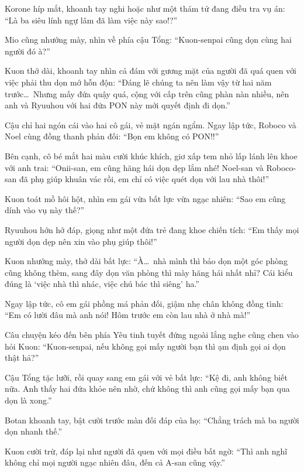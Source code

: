 \documentclass[../main.tex]{subfiles}
\begin{document}
Korone híp mắt, khoanh tay nghi hoặc như một thám tử đang điều tra vụ án: ``Là ba siêu lính ngự lâm đã làm việc này sao!?''


Mio cũng nhướng mày, nhìn về phía cậu Tổng: ``Kuon-senpai cũng dọn cùng hai người đó à?''

Kuon thở dài, khoanh tay nhìn cả đám với gương mặt của người đã quá quen với việc phải thu dọn mớ hỗn độn: ``Đáng lẽ chúng ta nên làm vậy từ hai năm trước\dots\ Nhưng mấy đứa quậy quá, cộng với cấp trên cũng phàn nàn nhiều, nên anh và Ryuuhou với hai đứa PON này mới quyết định đi dọn.''

Cậu chỉ hai ngón cái vào hai cô gái, vẻ mặt ngán ngẩm. Ngay lập tức, Roboco và Noel cùng đồng thanh phản đối: ``Bọn em không có PON!!''

Bên cạnh, cô bé mắt hai màu cười khúc khích, giơ xấp tem nhỏ lấp lánh lên khoe với anh trai: ``Onii-san, em cũng hăng hái dọn dẹp lắm nhé! Noel-san và Roboco-san đã phụ giúp khuân vác rồi, em chỉ có việc quét dọn với lau nhà thôi!''

Kuon toát mồ hôi hột, nhìn em gái vừa bất lực vừa ngạc nhiên: ``Sao em cũng dính vào vụ này thế?''

Ryuuhou hớn hở đáp, giọng như một đứa trẻ đang khoe chiến tích: ``Em thấy mọi người dọn dẹp nên xin vào phụ giúp thôi!''

Kuon nhướng mày, thở dài bất lực: ``À\dots\ nhà mình thì bảo dọn một góc phòng cũng không thèm, sang đây dọn văn phòng thì mày hăng hái nhất nhỉ? Cái kiểu đúng là `việc nhà thì nhác, việc chú bác thì siêng' ha.''

Ngay lập tức, cô em gái phồng má phản đối, giậm nhẹ chân không đồng tình: ``Em có lười đâu mà anh nói! Hôm trước em còn lau nhà ở nhà mà!''

Câu chuyện kéo đến bên phía Yêu tinh tuyết đứng ngoài lắng nghe cũng chen vào hỏi Kuon: ``Kuon-senpai, nếu không gọi mấy người bạn thì ạm định gọi ai dọn thật hả?''

Cậu Tổng tặc lưỡi, rồi quay sang em gái với vẻ bất lực: ``Kệ đi, anh không biết nữa. Anh thấy hai đứa khỏe nên nhờ, chứ không thì anh cũng gọi mấy bạn qua dọn là xong.''

Botan khoanh tay, bật cười trước màn đối đáp của họ: ``Chẳng trách mà ba người dọn nhanh thế.''

Kuon cười trừ, đáp lại như người đã quen với mọi điều bất ngờ: ``Thì anh nghĩ không chỉ mọi người ngạc nhiên đâu, đến cả A-san cũng vậy.''
\end{document}
